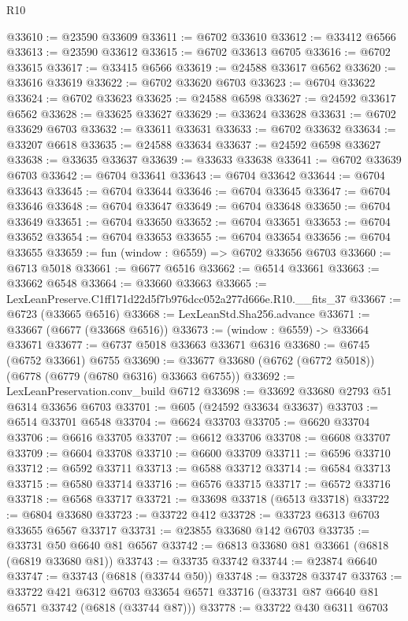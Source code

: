 \begin{lexlean}{R10}
\begin{coremodule}
@33610 := @23590 @33609
@33611 := @6702 @33610
@33612 := @33412 @6566
@33613 := @23590 @33612
@33615 := @6702 @33613 @6705
@33616 := @6702 @33615
@33617 := @33415 @6566
@33619 := @24588 @33617 @6562
@33620 := @33616 @33619
@33622 := @6702 @33620 @6703
@33623 := @6704 @33622
@33624 := @6702 @33623
@33625 := @24588 @6598
@33627 := @24592 @33617 @6562
@33628 := @33625 @33627
@33629 := @33624 @33628
@33631 := @6702 @33629 @6703
@33632 := @33611 @33631
@33633 := @6702 @33632
@33634 := @33207 @6618
@33635 := @24588 @33634
@33637 := @24592 @6598 @33627
@33638 := @33635 @33637
@33639 := @33633 @33638
@33641 := @6702 @33639 @6703
@33642 := @6704 @33641
@33643 := @6704 @33642
@33644 := @6704 @33643
@33645 := @6704 @33644
@33646 := @6704 @33645
@33647 := @6704 @33646
@33648 := @6704 @33647
@33649 := @6704 @33648
@33650 := @6704 @33649
@33651 := @6704 @33650
@33652 := @6704 @33651
@33653 := @6704 @33652
@33654 := @6704 @33653
@33655 := @6704 @33654
@33656 := @6704 @33655
@33659 := fun (window : @6559) => @6702 @33656 @6703
@33660 := @6713 @5018
@33661 := @6677 @6516
@33662 := @6514 @33661
@33663 := @33662 @6548
@33664 := @33660 @33663
@33665 := LexLeanPreserve.C1ff171d22d5f7b976dcc052a277d666e.R10.__fits_37
@33667 := @6723 (@33665 @6516)
@33668 := LexLeanStd.Sha256.advance
@33671 := @33667 (@6677 (@33668 @6516))
@33673 := (window : @6559) -> @33664 @33671
@33677 := @6737 @5018 @33663 @33671 @6316
@33680 := @6745 (@6752 @33661) @6755
@33690 := @33677 @33680 (@6762 (@6772 @5018)) (@6778 (@6779 (@6780 @6316) @33663 @6755))
@33692 := LexLeanPreservation.conv_build @6712
@33698 := @33692 @33680 @2793 @51 @6314 @33656 @6703
@33701 := @605 (@24592 @33634 @33637)
@33703 := @6514 @33701 @6548
@33704 := @6624 @33703
@33705 := @6620 @33704
@33706 := @6616 @33705
@33707 := @6612 @33706
@33708 := @6608 @33707
@33709 := @6604 @33708
@33710 := @6600 @33709
@33711 := @6596 @33710
@33712 := @6592 @33711
@33713 := @6588 @33712
@33714 := @6584 @33713
@33715 := @6580 @33714
@33716 := @6576 @33715
@33717 := @6572 @33716
@33718 := @6568 @33717
@33721 := @33698 @33718 (@6513 @33718)
@33722 := @6804 @33680
@33723 := @33722 @412
@33728 := @33723 @6313 @6703 @33655 @6567 @33717
@33731 := @23855 @33680 @142 @6703
@33735 := @33731 @50 @6640 @81 @6567
@33742 := @6813 @33680 @81 @33661 (@6818 (@6819 @33680 @81))
@33743 := @33735 @33742
@33744 := @23874 @6640
@33747 := @33743 (@6818 (@33744 @50))
@33748 := @33728 @33747
@33763 := @33722
    @421
    @6312
    @6703
    @33654
    @6571
    @33716
    (@33731 @87 @6640 @81 @6571 @33742 (@6818 (@33744 @87)))
@33778 := @33722
    @430
    @6311
    @6703

\end{coremodule}
\end{lexlean}
